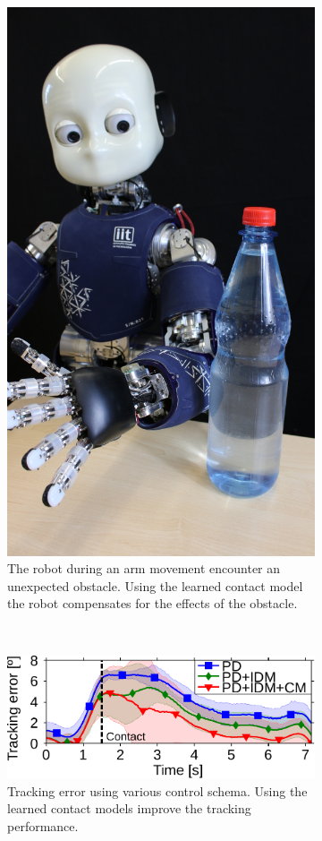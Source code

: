 \begin{figure}[h!]
    \centering
    \begin{subfigure}[t]{0.33\textwidth}
        \centering
       \includegraphics[width =.8\linewidth]{images/taskPush.jpg}
        \caption{The robot during an arm movement encounter an unexpected obstacle. Using the learned contact model the robot compensates for the effects of the obstacle.}
        \label{fig:exp3:icuparis_experiment_bars}
    \end{subfigure}%
    ~ 
    \begin{subfigure}[t]{0.62\textwidth}
        \centering
        \includegraphics[width=.89\linewidth]{images/trackErrContact3_mod}
        \caption{Tracking error using various control schema. Using the learned contact models improve the tracking performance.}
        \label{fig:exp3:gating}
    \end{subfigure}
    \caption{}
\end{figure}


